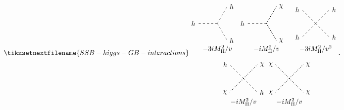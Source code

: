 \documentclass[fleqn]{NotesClass}
\newcommand{\Pparticle}[1]{\mathrm{#1}}
\newcommand{\Phiggs}{\ensuremath{\Pparticle{H}}}
\begin{document}
    \begin{equation}
        \tikzsetnextfilename{SSB-higgs-GB-interactions}
        \begin{tikzpicture}[baseline=(current bounding box)]
            \draw[dashed] (0, 0) -- (-1, 0) node [left] {\(h\)};
            \draw[dashed] (0, 0) -- (60:1) node [right] {\(h\)};
            \draw[dashed] (0, 0) -- (-60:1) node [right] {\(h\)};
            \draw[dashed] (2.5, 0) -- ++ (-1, 0) node [left] {\(h\)};
            \draw[dotted, thick] (2.5, 0) -- ++ (60:1) node [right] {\(\chi\)};
            \draw[dotted, thick] (2.5, 0) -- ++ (-60:1) node [right] {\(\chi\)};
            \draw[dashed] (5, 0) -- ++ (45:1) node [right] {\(h\)};
            \draw[dashed] (5, 0) -- ++ (135:1) node [left] {\(h\)};
            \draw[dashed] (5, 0) -- ++ (225:1) node [left] {\(h\)};
            \draw[dashed] (5, 0) -- ++ (315:1) node [right] {\(h\)};
            \node at (0, -1.3) {\(-3iM_{\Phiggs}^2/v\)};
            \node at (2.5, -1.3) {\(-iM_{\Phiggs}^2/v\)};
            \node at (5, -1.3) {\(-3iM_{\Phiggs}^2/v^2\)};
            \draw[dotted, thick] (1.33, -2.8) -- ++ (45:1) node [right] {\(\chi\)};
            \draw[dashed] (1.33, -2.8) -- ++ (135:1) node [left] {\(h\)};
            \draw[dotted, thick] (1.33, -2.8) -- ++ (225:1) node [left] {\(\chi\)};
            \draw[dashed] (1.33, -2.8) -- ++ (315:1) node [right] {\(h\)};
            \draw[dotted, thick] (3.66, -2.8) -- ++ (45:1) node [right] {\(\chi\)};
            \draw[dotted, thick] (3.66, -2.8) -- ++ (135:1) node [left] {\(\chi\)};
            \draw[dotted, thick] (3.66, -2.8) -- ++ (225:1) node [left] {\(\chi\)};
            \draw[dotted, thick] (3.66, -2.8) -- ++ (315:1) node [right] {\(\chi\)};
            \node at (1.33, -4) {\(-iM_{\Phiggs}^2/v\)};
            \node at (3.66, -4) {\(-iM_{\Phiggs}^2/v\)};
        \end{tikzpicture}
        .
    \end{equation}
    
\end{document}
